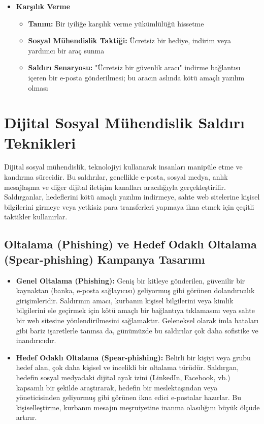 \begin{itemize}
    \item \textbf{Karşılık Verme}
    \begin{itemize}
        \item \textbf{Tanım:} Bir iyiliğe karşılık verme yükümlülüğü hissetme
        \item \textbf{Sosyal Mühendislik Taktiği:} Ücretsiz bir hediye, indirim veya yardımcı bir araç sunma
        \item \textbf{Saldırı Senaryosu:} "Ücretsiz bir güvenlik aracı" indirme bağlantısı içeren bir e-posta gönderilmesi; bu aracın aslında kötü amaçlı yazılım olması
    \end{itemize}
\end{itemize}

\section{Dijital Sosyal Mühendislik Saldırı Teknikleri}

Dijital sosyal mühendislik, teknolojiyi kullanarak insanları manipüle etme ve kandırma sürecidir. Bu saldırılar, genellikle e-posta, sosyal medya, anlık mesajlaşma ve diğer dijital iletişim kanalları aracılığıyla gerçekleştirilir. Saldırganlar, hedeflerini kötü amaçlı yazılım indirmeye, sahte web sitelerine kişisel bilgilerini girmeye veya yetkisiz para transferleri yapmaya ikna etmek için çeşitli taktikler kullanırlar.

\subsection{Oltalama (Phishing) ve Hedef Odaklı Oltalama (Spear-phishing) Kampanya Tasarımı}

\begin{itemize}
    \item \textbf{Genel Oltalama (Phishing):} Geniş bir kitleye gönderilen, güvenilir bir kaynaktan (banka, e-posta sağlayıcısı) geliyormuş gibi görünen dolandırıcılık girişimleridir. Saldırının amacı, kurbanın kişisel bilgilerini veya kimlik bilgilerini ele geçirmek için kötü amaçlı bir bağlantıya tıklamasını veya sahte bir web sitesine yönlendirilmesini sağlamaktır. Geleneksel olarak imla hataları gibi bariz işaretlerle tanınsa da, günümüzde bu saldırılar çok daha sofistike ve inandırıcıdır.
    \item \textbf{Hedef Odaklı Oltalama (Spear-phishing):} Belirli bir kişiyi veya grubu hedef alan, çok daha kişisel ve incelikli bir oltalama türüdür. Saldırgan, hedefin sosyal medyadaki dijital ayak izini (LinkedIn, Facebook, vb.) kapsamlı bir şekilde araştırarak, hedefin bir meslektaşından veya yöneticisinden geliyormuş gibi görünen ikna edici e-postalar hazırlar. Bu kişiselleştirme, kurbanın mesajın meşruiyetine inanma olasılığını büyük ölçüde artırır.
\end{itemize}

